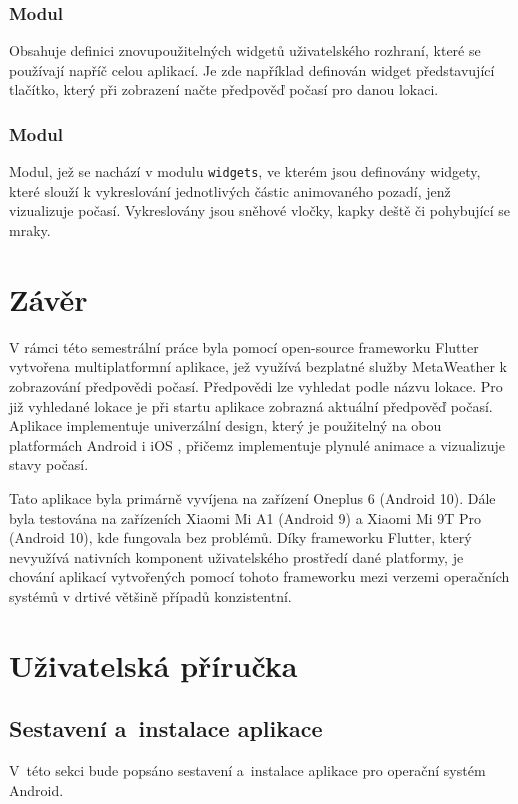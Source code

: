 \documentclass[12pt, a4paper]{article}
\let\oldsection\section
\renewcommand\section{\clearpage\oldsection}
\begin{document}
\subsubsection{Modul }
Obsahuje definici znovupoužitelných widgetů uživatelského rozhraní, které se používají napříč celou aplikací. Je zde například definován widget představující tlačítko, který při zobrazení načte předpověď počasí pro danou lokaci.

\subsubsection{Modul }
Modul, jež se nachází v modulu \texttt{widgets}, ve kterém jsou definovány widgety, které slouží k vykreslování jednotlivých částic animovaného pozadí, jenž vizualizuje počasí. Vykreslovány jsou sněhové vločky, kapky deště či pohybující se mraky.

\section{Závěr}
    V rámci této semestrální práce byla pomocí open-source frameworku Flutter vytvořena multiplatformní aplikace, jež využívá bezplatné služby MetaWeather k zobrazování předpovědi počasí. Předpovědi lze vyhledat podle názvu lokace. Pro již vyhledané lokace je při startu aplikace zobrazná aktuální předpověď počasí. Aplikace implementuje univerzální design, který je použitelný na obou platformách Android i iOS , přičemz implementuje plynulé animace a vizualizuje stavy počasí. 
    
Tato aplikace byla primárně vyvíjena na zařízení Oneplus 6 (Android 10). Dále byla testována na zařízeních Xiaomi Mi A1 (Android 9) a Xiaomi Mi 9T Pro (Android 10), kde fungovala bez problémů. Díky frameworku Flutter, který nevyužívá nativních komponent uživatelského prostředí dané platformy, je chování aplikací vytvořených pomocí tohoto frameworku mezi verzemi operačních systémů v drtivé většině případů konzistentní.


\renewcommand\thesection{\arabic{section}}
\renewcommand\thesubsection{\thesection.\arabic{subsection}}

\section{Uživatelská příručka}

\subsection{Sestavení a~instalace aplikace}
V~této sekci bude popsáno sestavení a~instalace aplikace pro operační systém Android.
\end{document}
